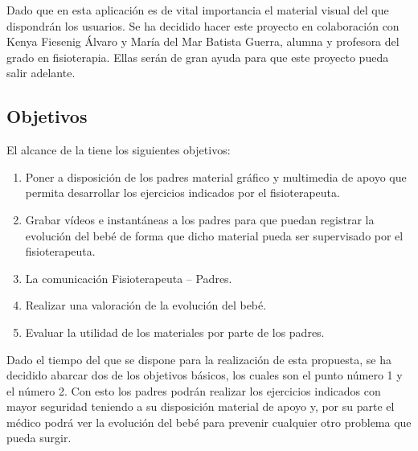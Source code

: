 \bigskip
Dado que en esta aplicación es de vital importancia el material visual del que dispondrán
los usuarios. Se ha decidido hacer este proyecto en colaboración con Kenya Fiesenig Álvaro y
María del Mar Batista Guerra, alumna y profesora del grado en fisioterapia. Ellas serán de gran
ayuda para que este proyecto pueda salir adelante.

\bigskip
\subsection{Objetivos}
El alcance de la \textbf{\myTitle} tiene los siguientes objetivos:
\begin{enumerate}
    \item Poner a disposición de los padres material gráfico y multimedia de apoyo que permita desarrollar los ejercicios indicados por el fisioterapeuta.
    \item Grabar vídeos e instantáneas a los padres para que puedan registrar la evolución del bebé de forma que dicho material pueda ser supervisado por el fisioterapeuta.
    \item La comunicación Fisioterapeuta – Padres.
    \item Realizar una valoración de la evolución del bebé.
    \item Evaluar la utilidad de los materiales por parte de los padres.
\end{enumerate}

Dado el tiempo del que se dispone para la realización de esta propuesta, se ha decidido abarcar
dos de los objetivos básicos, los cuales son el punto número 1 y el número 2. Con esto los padres
podrán realizar los ejercicios indicados con mayor seguridad teniendo a su disposición material
de apoyo y, por su parte el médico podrá ver la evolución del bebé para prevenir cualquier otro
problema que pueda surgir.
